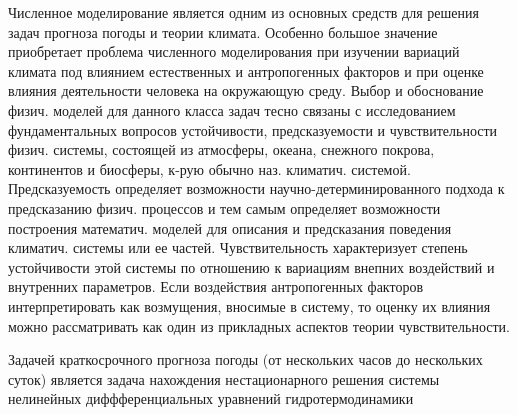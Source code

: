 \documentclass[10pt]{article}
\begin{document}
Численное моделирование является одним из основных средств для решения задач прогноза погоды и теории климата. Особенно большое значение приобретает проблема численного моделирования при изучении вариаций климата под влиянием естественных и антропогенных факторов и при оценке влияния деятельности человека на окружающую среду. Выбор и обоснование физич. моделей для данного класса задач тесно связаны с исследованием фундаментальных вопросов устойчивости, предсказуемости и чувствительности физич. системы, состоящей из атмосферы, океана, снежного покрова, континентов и биосферы, к-рую обычно наз. климатич. системой. Предсказуемость определяет возможности научно-детерминированного подхода к предсказанию физич. процессов и тем самым определяет возможности построения математич. моделей для описания и предсказания поведения климатич. системы или ее частей. Чувствительность характеризует степень устойчивости этой системы по отношению к вариациям внепних воздействий и внутренних параметров. Если воздействия антропогенных факторов интерпретировать как возмущения, вносимые в систему, то оценку их влияния можно рассматривать как один из прикладных аспектов теории чувствительности.



Задачей краткосрочного прогноза погоды (от нескольких часов до нескольких суток) является задача нахождения нестационарного решения системы нелинейных диффференциальных уравнений гидротермодинамики
\end{document}
